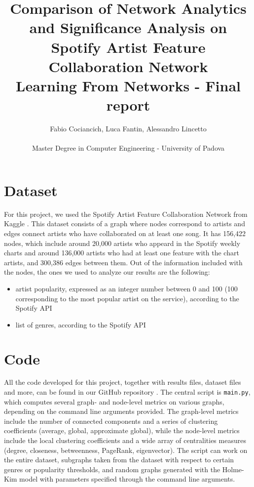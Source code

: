 \documentclass[a4paper, 12pt, conference]{ieeeconf}      %
\title{Comparison of Network Analytics and Significance Analysis on Spotify Artist Feature Collaboration Network\\
\large Learning From Networks - Final report \\}
\author{Fabio Cociancich, Luca Fantin, Alessandro Lincetto %
\\\\ Master Degree in Computer Engineering - University of Padova \\
}
\begin{document}
\maketitle
\thispagestyle{plain}
\pagestyle{plain}

\section{Dataset}

For this project, we used the Spotify Artist Feature Collaboration Network from Kaggle \cite{dataset}. This dataset consists of a graph where nodes correspond to artists and edges connect artists who have collaborated on at least one song. It has 156,422 nodes, which include around 20,000 artists who appeard in the Spotify weekly charts and around 136,000 artists who had at least one feature with the chart artists, and 300,386 edges between them. Out of the information included with the nodes, the ones we used to analyze our results are the following:
\begin{itemize}
    \item artist popularity, expressed as an integer number between 0 and 100 (100 corresponding to the most popular artist on the service), according to the Spotify API
    \item list of genres, according to the Spotify API
\end{itemize}

\section{Code}

All the code developed for this project, together with results files, dataset files and more, can be found in our GitHub repository \cite{githubRepo}. The central script is \texttt{main.py}, which computes several graph- and node-level metrics on various graphs, depending on the command line arguments provided. The graph-level metrics include the number of connected components and a series of clustering coefficients (average, global, approximate global), while the node-level metrics include the local clustering coefficients and a wide array of centralities measures (degree, closeness, betweenness, PageRank, eigenvector). The script can work on the entire dataset, subgraphs taken from the dataset with respect to certain genres or popularity thresholds, and random graphs generated with the Holme-Kim model \cite{Holme2002} with parameters specified through the command line arguments.
\end{document}
